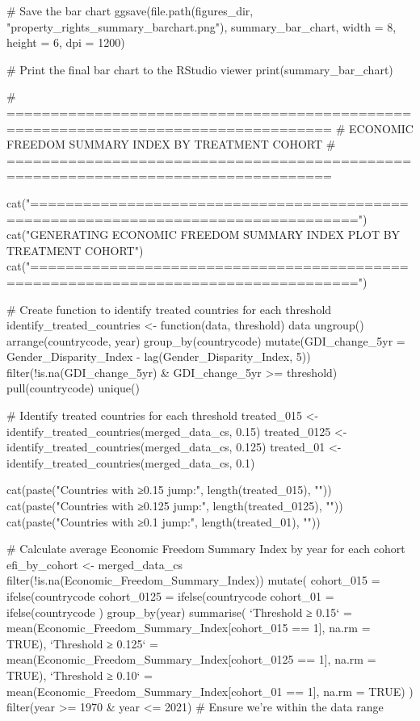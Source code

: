{{# Save the bar chart
ggsave(file.path(figures_dir, "property_rights_summary_barchart.png"),
       summary_bar_chart, width = 8, height = 6, dpi = 1200)

# Print the final bar chart to the RStudio viewer
print(summary_bar_chart)

# ===================================================================================
# ECONOMIC FREEDOM SUMMARY INDEX BY TREATMENT COHORT
# ===================================================================================

cat("\n===================================================================================\n")
cat("GENERATING ECONOMIC FREEDOM SUMMARY INDEX PLOT BY TREATMENT COHORT\n")
cat("===================================================================================\n\n")

# Create function to identify treated countries for each threshold
identify_treated_countries <- function(data, threshold) {
  data %
    ungroup() %
    arrange(countrycode, year) %
    group_by(countrycode) %
    mutate(GDI_change_5yr = Gender_Disparity_Index - lag(Gender_Disparity_Index, 5)) %
    filter(!is.na(GDI_change_5yr) & GDI_change_5yr >= threshold) %
    pull(countrycode) %
    unique()
}

# Identify treated countries for each threshold
treated_015 <- identify_treated_countries(merged_data_cs, 0.15)
treated_0125 <- identify_treated_countries(merged_data_cs, 0.125)
treated_01 <- identify_treated_countries(merged_data_cs, 0.1)

cat(paste("Countries with ≥0.15 jump:", length(treated_015), "\n"))
cat(paste("Countries with ≥0.125 jump:", length(treated_0125), "\n"))
cat(paste("Countries with ≥0.1 jump:", length(treated_01), "\n\n"))

# Calculate average Economic Freedom Summary Index by year for each cohort
efi_by_cohort <- merged_data_cs %
  filter(!is.na(Economic_Freedom_Summary_Index)) %
  mutate(
    cohort_015 = ifelse(countrycode %
    cohort_0125 = ifelse(countrycode %
    cohort_01 = ifelse(countrycode %
  ) %
  group_by(year) %
  summarise(
    `Threshold ≥ 0.15` = mean(Economic_Freedom_Summary_Index[cohort_015 == 1], na.rm = TRUE),
    `Threshold ≥ 0.125` = mean(Economic_Freedom_Summary_Index[cohort_0125 == 1], na.rm = TRUE),
    `Threshold ≥ 0.10` = mean(Economic_Freedom_Summary_Index[cohort_01 == 1], na.rm = TRUE)
  ) %
  filter(year >= 1970 & year <= 2021)  # Ensure we're within the data range

}}

